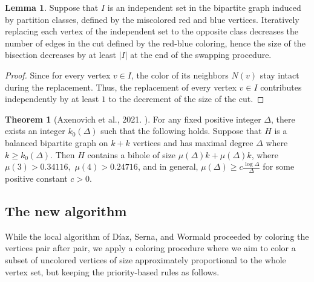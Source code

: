 \documentclass{article}
\theoremstyle{definition}
\newtheorem{theorem}[definition]{Theorem}
\newtheorem{lemma}[definition]{Lemma}
\begin{document}
\begin{lemma}\label{indep} Suppose that $I$ is an independent set in the bipartite graph induced by partition classes, defined by the miscolored red and blue vertices. Iteratively replacing each vertex of the independent set to the opposite class decreases the number of edges in the cut defined by the red-blue coloring, hence the size of the bisection decreases by at least $|I|$ at the end of the swapping procedure.
\end{lemma}

\begin{proof} Since for every vertex $v\in I$, the color of its neighbors $N(v)$ stay intact during the replacement. Thus, the replacement  of every vertex $v\in I$ contributes independently by at least $1$ to the decrement of the size of the cut.
\end{proof}

\begin{theorem}[Axenovich et al., 2021. \cite{axenovich2021bipartite}] \label{biholeswap}
 For any fixed positive integer $\Delta$, there exists an integer $k_0(\Delta)$ such that the following holds.
Suppose that $H$ is a balanced bipartite graph on $k+k$ vertices and has maximal degree $\Delta$ where $k\ge k_0(\Delta)$. Then $H$ contains a bihole of size $\mu(\Delta)k+\mu(\Delta)k$,
where $\mu(3)>0.34116,$ $ \mu(4)>0.24716$, and in general, $\mu(\Delta)\ge c\frac{\log{\Delta}}{{\Delta}}$ for some positive constant $c>0$.
\end{theorem}

\subsection{The new algorithm}\label{subsec:newalg}

While the local algorithm of Díaz, Serna, and Wormald proceeded by coloring the vertices pair after pair, we apply a coloring procedure where we aim to color a subset of uncolored vertices of size approximately proportional to the whole vertex set, but keeping the priority-based rules as follows.
\end{document}
